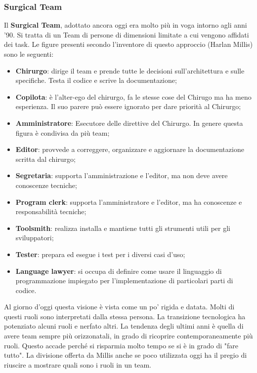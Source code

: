 \subsubsection{Surgical Team}
Il \textbf{Surgical Team}, adottato ancora oggi era molto più in voga intorno agli anni '90. Si tratta di un Team di persone di dimensioni limitate a cui vengono affidati dei task. Le figure presenti secondo l'inventore di questo approccio (Harlan Millis) sono le seguenti:
\begin{itemize}
	\item \textbf{Chirurgo}: dirige il team e prende tutte le decisioni sull'architettura e sulle specifiche. Testa il codice e scrive la documentazione;
	\item \textbf{Copilota}: è l'alter-ego del chirurgo, fa le stesse cose del Chirugo ma ha meno esperienza. Il suo parere può essere ignorato per dare priorità al Chirurgo;
	\item \textbf{Amministratore}: Esecutore delle direttive del Chirurgo. In genere questa figura è condivisa da più team;
	\item \textbf{Editor}: provvede a correggere, organizzare e aggiornare la documentazione scritta dal chirurgo;
	\item \textbf{Segretaria}: supporta l'amministrazione e l'editor, ma non deve avere conoscenze tecniche;
	\item \textbf{Program clerk}: supporta l'amministratore e l'editor, ma ha conoscenze e responsabilità tecniche;
	\item \textbf{Toolsmith}: realizza installa e mantiene tutti gli strumenti utili per gli sviluppatori;
	\item \textbf{Tester}: prepara ed esegue i test per i diversi casi d'uso;
	\item \textbf{Language lawyer}: si occupa di definire come usare il linguaggio di programmazione impiegato per l'implementazione di particolari parti di codice.
\end{itemize}
Al giorno d'oggi questa visione è vista come un po' rigida e datata. Molti di questi ruoli sono interpretati dalla stessa persona. La transizione tecnologica ha potenziato alcuni ruoli e nerfato altri. La tendenza degli ultimi anni è quella di avere team sempre più orizzonatali, in grado di ricoprire contemporaneamente più ruoli. Questo accade perché si risparmia molto tempo se si è in grado di "fare tutto". La divisione offerta da Millis anche se poco utilizzata oggi ha il pregio di riuscire a mostrare quali sono i ruoli in un team.
